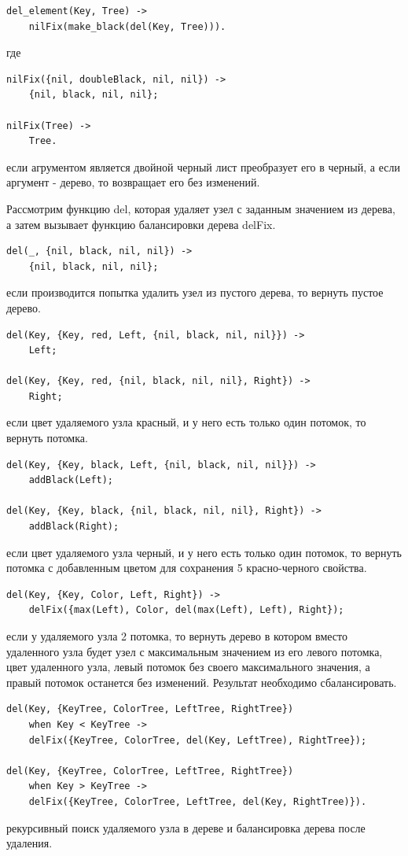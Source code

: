 			\begin{lstlisting}
del_element(Key, Tree) -> 
    nilFix(make_black(del(Key, Tree))).
			\end{lstlisting}
			где 
			\begin{lstlisting}
nilFix({nil, doubleBlack, nil, nil}) ->
    {nil, black, nil, nil};
	
nilFix(Tree) ->
    Tree.					
			\end{lstlisting}	
			если агрументом является двойной черный лист преобразует его в черный,
			а если аргумент - дерево, то возвращает его без изменений.
			
			Рассмотрим функцию del, которая удаляет узел с заданным значением из дерева,
			а затем вызывает функцию балансировки дерева delFix. 
			\begin{lstlisting}
del(_, {nil, black, nil, nil}) ->
    {nil, black, nil, nil};
			\end{lstlisting}
			если производится попытка удалить узел из пустого дерева, то вернуть пустое дерево.
			\begin{lstlisting}
del(Key, {Key, red, Left, {nil, black, nil, nil}}) ->
    Left;
	
del(Key, {Key, red, {nil, black, nil, nil}, Right}) ->
    Right;
			\end{lstlisting}
			если цвет удаляемого узла красный, и у него есть только один потомок, то
			вернуть потомка.
			\begin{lstlisting}
del(Key, {Key, black, Left, {nil, black, nil, nil}}) ->
    addBlack(Left);
		
del(Key, {Key, black, {nil, black, nil, nil}, Right}) ->
    addBlack(Right);
			\end{lstlisting}
			если цвет удаляемого узла черный, и у него есть только один потомок, то
			вернуть потомка с добавленным цветом для сохранения 5 красно-черного свойства.
			\begin{lstlisting}
del(Key, {Key, Color, Left, Right})	->
    delFix({max(Left), Color, del(max(Left), Left), Right});
			\end{lstlisting}
			если у удаляемого узла 2 потомка, то вернуть дерево в котором вместо удаленного 
			узла будет узел с максимальным значением из его левого потомка, цвет удаленного узла, 
			левый потомок без своего максимального значения, а правый потомок останется без изменений.
			Результат необходимо сбалансировать.
			\begin{lstlisting}
del(Key, {KeyTree, ColorTree, LeftTree, RightTree}) 
    when Key < KeyTree ->
    delFix({KeyTree, ColorTree, del(Key, LeftTree), RightTree});
			
del(Key, {KeyTree, ColorTree, LeftTree, RightTree}) 
    when Key > KeyTree ->	
    delFix({KeyTree, ColorTree, LeftTree, del(Key, RightTree)}).
			\end{lstlisting}
			рекурсивный поиск удаляемого узла в дереве и балансировка дерева после 
			удаления.
			
